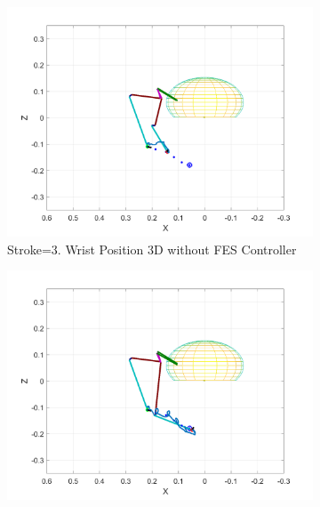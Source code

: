 \newpage
\begin{landscape}
    \begin{figure}[ht]
        \centering
        \begin{subfigure}[b]{0.33\textwidth}
            \centering
            \includegraphics[width=\linewidth]{Pictures/Results/Controller/Stroke3/6_wp_nofes.png}
            \caption{Stroke=3. Wrist Position 3D without FES Controller}
        \end{subfigure}%
        \hfill
        \begin{subfigure}[b]{0.33\textwidth}
            \centering
            \includegraphics[width=\linewidth]{Pictures/Results/Controller/Stroke3/6_wp_fes.png}

\end{subfigure}
\end{figure}
\end{landscape}
